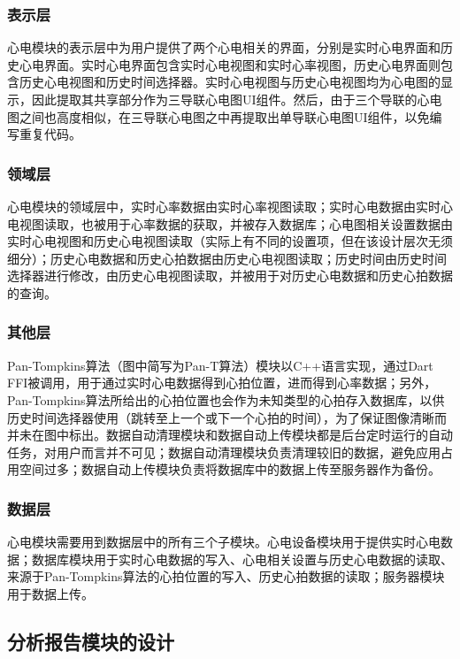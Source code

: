 \subsubsection{表示层}

心电模块的表示层中为用户提供了两个心电相关的界面，分别是实时心电界面和历史心电界面。实时心电界面包含实时心电视图和实时心率视图，历史心电界面则包含历史心电视图和历史时间选择器。实时心电视图与历史心电视图均为心电图的显示，因此提取其共享部分作为三导联心电图UI组件。然后，由于三个导联的心电图之间也高度相似，在三导联心电图之中再提取出单导联心电图UI组件，以免编写重复代码。

\subsubsection{领域层}

心电模块的领域层中，实时心率数据由实时心率视图读取；实时心电数据由实时心电视图读取，也被用于心率数据的获取，并被存入数据库；心电图相关设置数据由实时心电视图和历史心电视图读取（实际上有不同的设置项，但在该设计层次无须细分）；历史心电数据和历史心拍数据由历史心电视图读取；历史时间由历史时间选择器进行修改，由历史心电视图读取，并被用于对历史心电数据和历史心拍数据的查询。

\subsubsection{其他层}

Pan-Tompkins算法（图中简写为Pan-T算法）模块以C++语言实现，通过Dart FFI被调用，用于通过实时心电数据得到心拍位置，进而得到心率数据；另外，Pan-Tompkins算法所给出的心拍位置也会作为未知类型的心拍存入数据库，以供历史时间选择器使用（跳转至上一个或下一个心拍的时间），为了保证图像清晰而并未在图中标出。数据自动清理模块和数据自动上传模块都是后台定时运行的自动任务，对用户而言并不可见；数据自动清理模块负责清理较旧的数据，避免应用占用空间过多；数据自动上传模块负责将数据库中的数据上传至服务器作为备份。

\subsubsection{数据层}

心电模块需要用到数据层中的所有三个子模块。心电设备模块用于提供实时心电数据；数据库模块用于实时心电数据的写入、心电相关设置与历史心电数据的读取、来源于Pan-Tompkins算法的心拍位置的写入、历史心拍数据的读取；服务器模块用于数据上传。

\subsection{分析报告模块的设计}\label{subsec:analytics-design}

